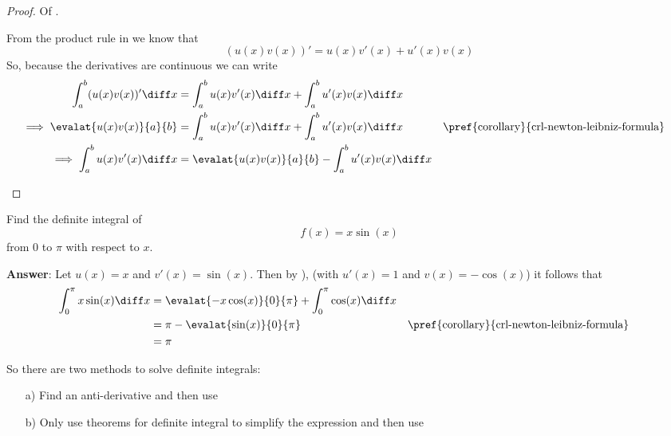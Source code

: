 \begin{proof}
	Of .
	\begin{flushleft}
		From the product rule in  we know that
		\begin{equation*}
			(u(x)v(x))' = u(x)v'(x) + u'(x)v(x)
		\end{equation*}
		So, because the derivatives are continuous we can write
		\begin{align*}
			\int_a^b (u(x)v(x))' \diff x & = \int_a^b u(x)v'(x) \diff x + \int_a^b u'(x)v(x) \diff x                                                          \\
			\implies
			\evalat{u(x)v(x)}{a}{b}      & = \int_a^b u(x)v'(x) \diff x + \int_a^b u'(x)v(x) \diff x &  & \text{\pref{corollary}{crl-newton-leibniz-formula}} \\
			\implies
			\int_a^b u(x)v'(x) \diff x   & = \evalat{u(x)v(x)}{a}{b} -  \int_a^b u'(x)v(x) \diff x
		\end{align*}
	\end{flushleft}
\end{proof}

\begin{exm}\label{exm-integration-by-parts-definite-integrals}
	Find the definite integral of
	\begin{equation*}
		f(x) = x\sin(x)
	\end{equation*}
	from $0$ to $\pi$ with respect to $x$.
	\begin{flushleft}
		\textbf{Answer}: Let $u(x)=x$ and $v'(x)=\sin(x)$. Then by
		), (with $u'(x)=1$
		and $v(x)=-\cos(x)$) it follows that
		\begin{align*}
			\int_0^\pi x\sin(x) \diff x & = \evalat{-x\cos(x)}{0}{\pi} + \int_0^\pi \cos(x) \diff x                                                          \\
			                            & = \pi - \evalat{\sin(x)}{0}{\pi}                          &  & \text{\pref{corollary}{crl-newton-leibniz-formula}} \\
			                            & = \pi
		\end{align*}
	\end{flushleft}
\end{exm}

\begin{rem}
	So there are two methods to solve definite integrals:
	\begin{enumerate}
		\item[a)] Find an anti-derivative and then use 
		\item[b)] Only use theorems for definite integral to simplify the expression and then use 
	\end{enumerate}
\end{rem}

